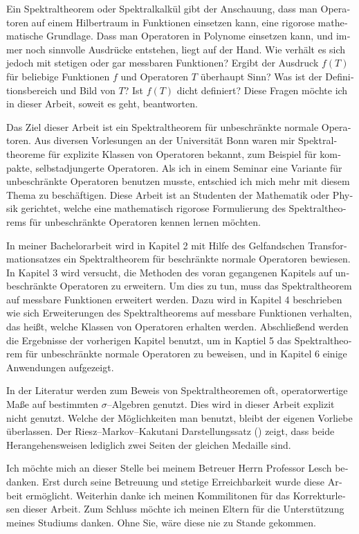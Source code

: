 \vspace{.35cm}

\noindent
\begin{otherlanguage}{ngerman}
Ein Spektraltheorem oder Spektralkalkül gibt der Anschauung, dass man 
Operatoren auf einem Hilbertraum in Funktionen einsetzen kann, eine 
rigorose mathematische Grundlage.
Dass man Operatoren in Polynome einsetzen kann, und immer noch sinnvolle
Ausdrücke entstehen, liegt auf der Hand. Wie verhält es sich jedoch mit
stetigen oder gar messbaren Funktionen? Ergibt der Ausdruck $f(T)$ für
beliebige Funktionen $f$ und Operatoren $T$ überhaupt Sinn? Was ist 
der Definitionsbereich und Bild von $T$? Ist $f(T)$ dicht definiert?
Diese Fragen möchte ich in dieser Arbeit, soweit es geht, beantworten.

Das Ziel dieser Arbeit ist ein Spektraltheorem für unbeschränkte normale 
Operatoren. Aus diversen Vorlesungen an der Universität Bonn waren mir
Spektraltheoreme für explizite Klassen von Operatoren bekannt, zum 
Beispiel für kompakte, selbstadjungerte Operatoren. Als ich in einem Seminar
eine Variante für unbeschränkte Operatoren benutzen musste, entschied ich
mich mehr mit diesem Thema zu beschäftigen. Diese Arbeit
ist an Studenten der Mathematik oder Physik gerichtet, welche eine 
mathematisch rigorose Formulierung des Spektraltheorems
für unbeschränkte Operatoren kennen lernen möchten.

In meiner Bachelorarbeit wird in Kapitel 2 mit Hilfe des Gelfandschen 
Transformationsatzes ein Spektraltheorem für beschränkte normale Operatoren 
bewiesen. In Kapitel 3 wird versucht, die Methoden des voran gegangenen Kapitels
auf unbeschränkte Operatoren zu erweitern. Um dies zu tun, muss das 
Spektraltheorem auf messbare Funktionen erweitert werden.
Dazu wird in Kapitel 4 beschrieben wie sich Erweiterungen des 
Spektraltheorems auf messbare Funktionen verhalten, das heißt, welche Klassen
von Operatoren erhalten werden. Abschließend werden die Ergebnisse der 
vorherigen Kapitel benutzt, um in Kaptiel 5 das Spektraltheorem für unbeschränkte normale
Operatoren zu beweisen, und in Kapitel 6 einige Anwendungen aufgezeigt.

In der Literatur werden zum Beweis von Spektraltheoremen oft, operatorwertige
Maße auf bestimmten $\sigma$--Algebren genutzt.
Dies wird in dieser Arbeit explizit nicht genutzt. Welche der Möglichkeiten
man benutzt, bleibt der eigenen Vorliebe überlassen. Der Riesz--Markov--Kakutani
Darstellungssatz (\cite[Theorem 6.3.4]{PedAnaN})
zeigt, dass beide Herangehensweisen
lediglich zwei Seiten der gleichen Medaille sind. 

Ich möchte mich an dieser Stelle bei meinem Betreuer Herrn Professor Lesch bedanken.
Erst durch seine Betreuung und stetige Erreichbarkeit wurde diese Arbeit ermöglicht.
Weiterhin danke ich meinen Kommilitonen für das Korrekturlesen dieser Arbeit. 
Zum Schluss möchte ich meinen Eltern für die Unterstützung meines Studiums danken.
Ohne Sie, wäre diese nie zu Stande gekommen.


\end{otherlanguage}

